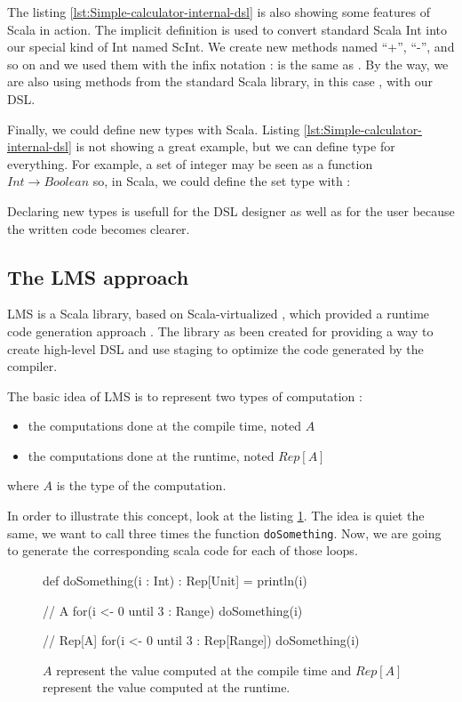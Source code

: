 The listing \ref{lst:Simple-calculator-internal-dsl} is also showing some
features of Scala in action. The implicit definition  is used to
convert standard Scala Int into our special kind of Int named ScInt. We create
new methods named ``+'', ``-'', and so on and we used them with the infix
notation :  is the same as . By the way,
we are also using methods from the standard Scala library, in this case
, with our \gls{DSL}.

Finally, we could define new types with Scala. Listing
\ref{lst:Simple-calculator-internal-dsl} is not showing a great example,
but we can define type for everything. For example, a set of integer may be seen
as a function $Int \rightarrow Boolean$ so, in Scala, we could define the set
type with :


Declaring new types is usefull for the \gls{DSL} designer as well as for the user
because the written code becomes clearer.

\subsection{The LMS approach}
\label{subsec:lms_approach}

\gls{LMS} is a Scala library, based on Scala-virtualized \cite{Rompf2012}, which
provided a runtime code generation approach
\cite{Rompf:2010:LMS:1942788.1868314}. The library as been created for providing
a way to create high-level \gls{DSL} and use staging to optimize the code
generated by the compiler.

The basic idea of \gls{LMS} is to represent two types of computation :
\begin{itemize}
\item the computations done at the compile time, noted $A$
\item the computations done at the runtime, noted $Rep[A]$
\end{itemize}

where $A$ is the type of the computation.

In order to illustrate this concept, look at the listing \ref{lst:lms-example}.
The idea is quiet the same, we want to call three times the function
{\normalsize \verb|doSomething|}. Now, we are going to generate the
corresponding scala code for each of those loops.

\begin{figure}[ht]
  \centering
\begin{scalacode}
def doSomething(i : Int) : Rep[Unit] = {
  println(i)
}

// A
for(i <- 0 until 3 : Range) {
  doSomething(i)
}

// Rep[A]
for(i <- 0 until 3 : Rep[Range]) {
  doSomething(i)
}
\end{scalacode}
  \caption[Difference between \(A\) and \(Rep\lbrack A\rbrack\) in a code example]{$A$ represent
    the value computed at the compile time and $Rep[A]$ represent the value
    computed at the runtime.}
  \label{lst:lms-example}
\end{figure}

